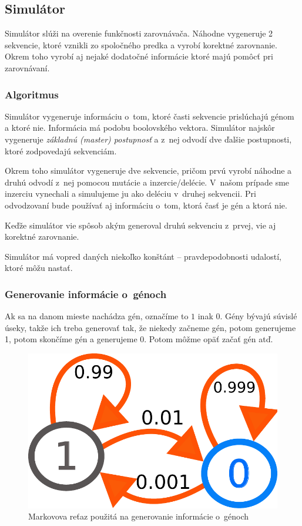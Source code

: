 \subsection{Simulátor}

Simulátor slúži na overenie funkčnosti zarovnávača. Náhodne vygeneruje 2 sekvencie, ktoré vznikli zo spoločného predka a vyrobí korektné zarovnanie. Okrem toho vyrobí aj nejaké dodatočné informácie ktoré majú pomôcť pri zarovnávaní.

\subsubsection{Algoritmus}
Simulátor vygeneruje informáciu o~tom, ktoré časti sekvencie prislúchajú génom a ktoré nie. Informácia má podobu boolovského vektora.
Simulátor najskôr vygeneruje \textit{základnú (master) postupnosť} a z~nej odvodí dve ďalšie postupnosti, ktoré zodpovedajú sekvenciám.

Okrem toho simulátor vygeneruje dve sekvencie, pričom prvú vyrobí náhodne a druhú odvodí z~nej pomocou mutácie a inzercie/delécie.
V~našom prípade sme inzerciu vynechali a simulujeme ju ako deléciu v~druhej sekvencii.
Pri odvodzovaní bude používať aj informáciu o~tom, ktorá časť je gén a ktorá nie.

Keďže simulátor vie spôsob akým generoval druhú sekvenciu z~prvej, vie aj korektné zarovnanie.

Simulátor má vopred daných niekoľko konštánt -- pravdepodobnosti udalostí, ktoré môžu nastať.

\subsubsection{Generovanie informácie o~génoch}
Ak sa na danom mieste nachádza gén, označíme to $1$ inak $0$.
Gény bývajú súvislé úseky, takže ich treba generovať tak, že niekedy začneme gén, potom generujeme 1, potom skončíme gén a generujeme 0. Potom môžme opäť začať gén atď.

\begin{figure}[htp]
    \centering
    \includegraphics[width=.3\textwidth]{images/markov_chain}
    \caption{Markovova reťaz použitá na generovanie informácie o~génoch}
    \label{fig:markov-chain}
\end{figure}

